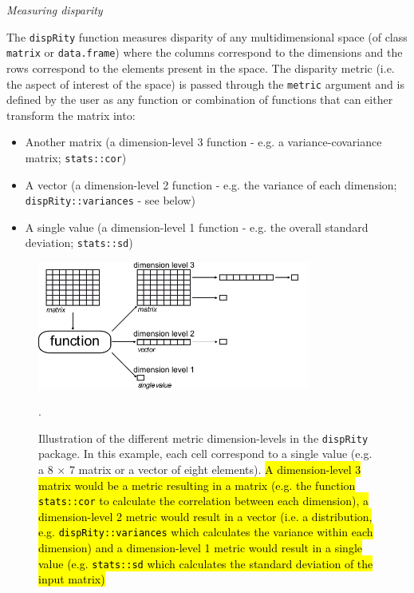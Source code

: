 \documentclass[12pt,letterpaper]{article}
\renewcommand{\subsection}[1]{%
\bigskip
\begin{center}
\begin{large}
\normalfont\itshape #1
\end{large}
\end{center}}
\newcommand{\disp}{\texttt{dispRity} }
\begin{document}
\subsection{Measuring disparity}
The \disp function measures disparity of any multidimensional space (of class \texttt{matrix} or \texttt{data.frame}) where the columns correspond to the dimensions and the rows correspond to the elements present in the space.
The disparity metric (i.e. the aspect of interest of the space) is passed through the \texttt{metric} argument and is defined by the user as any function or combination of functions that can either transform the matrix into:

\begin{itemize}
    \item Another matrix (a dimension-level 3 function - e.g. a variance-covariance matrix; \texttt{stats::cor})
    \item A vector (a dimension-level 2 function - e.g. the variance of each dimension; \texttt{dispRity::variances} - see below)
    \item A single value (a dimension-level 1 function - e.g. the overall standard deviation; \texttt{stats::sd})
\end{itemize}

\begin{figure}[!htbp]
\centering
   \includegraphics[width=0.8\textwidth]{../inst/gitbook/dispRity_fun.pdf} 
\caption{Illustration of the different metric dimension-levels in the \disp package. In this example, each cell correspond to a single value (e.g. a 8 $\times$ 7 matrix or a vector of eight elements).
\hl{A dimension-level 3 matrix would be a metric resulting in a matrix (e.g. the function \texttt{stats::cor} to calculate the correlation between each dimension), a dimension-level 2 metric would result in a vector (i.e. a distribution, e.g. \texttt{dispRity::variances} which calculates the variance within each dimension) and a dimension-level 1 metric would result in a single value (e.g. \texttt{stats::sd} which calculates the standard deviation of the input matrix)}}.
\label{Fig:levels}
\end{figure}
\end{document}

